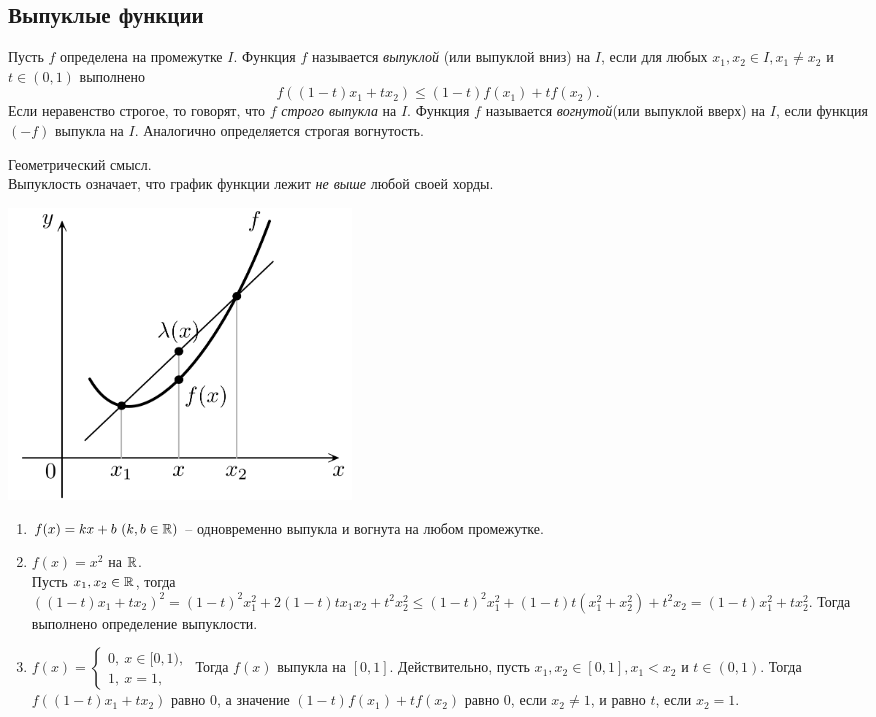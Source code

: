 \subsection{Выпуклые функции}

\begin{definition}
    Пусть $f$ определена на промежутке $I$. Функция $f$ называется \textit{выпуклой} (или выпуклой вниз) на $I$, если для любых $x_{1}, x_{2} \in I, x_{1} \neq x_{2}$ и $t \in (0,1)$ выполнено
    \[f((1-t)x_{1} + tx_{2}) \leq (1-t)f(x_{1}) + tf(x_{2}).\]
    Если неравенство строгое, то говорят, что $f$ \textit{строго выпукла} на $I$. Функция $f$ называется \textit{вогнутой}(или выпуклой вверх) на $I$, если функция $(-f)$ выпукла на $I$. Аналогично определяется строгая вогнутость.
\end{definition}

\begin{note}
    Геометрический смысл.\\
    Выпуклость означает, что график функции лежит \textit{не выше} любой своей хорды.
    \begin{center}
        \includegraphics[width=0.4\textwidth]{ex2.png}
    \end{center}
\end{note}

\begin{example}
    \begin{enumerate}
        \item $f(x)= kx+b \ (k,b \in \mathbb{R})$ -- одновременно выпукла и вогнута на любом промежутке.
        \item $f(x) = x^{2}$ на $\mathbb{R}$.\\
        Пусть $x_{1}, x_{2} \in \mathbb{R}$, тогда $((1-t)x_{1} + tx_{2})^{2} = (1-t)^{2}x_{1}^{2} + 2(1-t)tx_{1}x_{2} + t^{2}x_{2}^{2} \leq (1-t)^{2}x_{1}^{2} + (1-t)t(x_{1}^{2} + x_{2}^{2}) + t^{2}x_{2} = (1-t)x_{1}^{2} + tx_{2}^{2}.$ Тогда выполнено определение выпуклости.
        \item $f(x) = $$\begin{cases}
        0, \ x \in [0,1),\\
        1, \ x = 1,
    \end{cases}$
    Тогда $f(x)$ выпукла на $[0,1]$. Действительно, пусть $x_{1}, x_{2} \in [0,1], x_{1} < x_{2}$ и $t \in (0, 1)$. Тогда $f((1-t)x_{1} + tx_{2})$ равно 0, а значение $(1-t)f(x_{1}) + tf(x_{2})$ равно 0, если $x_{2} \neq 1$, и равно $t$, если $x_{2} = 1$.
    \end{enumerate}
\end{example}


